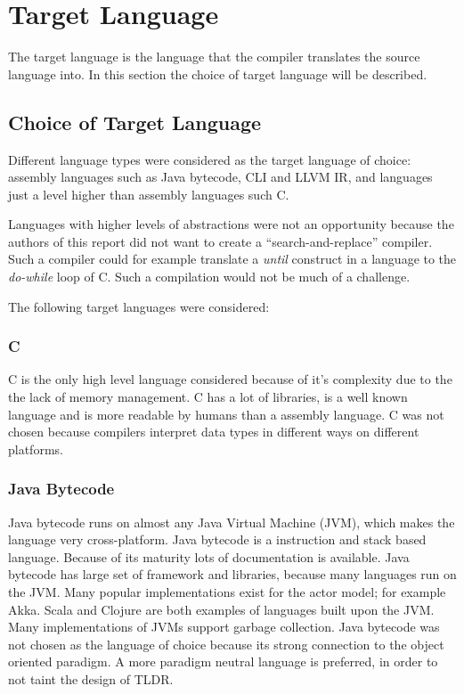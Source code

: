 
\section{Target Language}
\label{sec:targetLanguage}

The target language is the language that the compiler translates the source language into. In this section the choice of target language will be described.

\subsection{Choice of Target Language}

Different language types were considered as the target language of choice: assembly languages such as Java bytecode, CLI and LLVM IR, and languages just a level higher than assembly languages such C.

Languages with higher levels of abstractions were not an opportunity because the authors of this report did not want to create a \enquote{search-and-replace} compiler. Such a compiler could for example translate a \emph{until} construct in a language to the \emph{do-while} loop of C. Such a compilation would not be much of a challenge. 

The following target languages were considered:

\subsubsection{C}
C is the only high level language considered because of it's complexity due to the the lack of memory management. C has a lot of libraries, is a well known language and is more readable by humans than a assembly language. C was not chosen because compilers interpret data types in different ways on different platforms. 

\subsubsection{Java Bytecode}
Java bytecode runs on almost any Java Virtual Machine (JVM), which makes the language very cross-platform. Java bytecode is a instruction and stack based language. Because of its maturity lots of documentation is available. Java bytecode has large set of framework and libraries, because many languages run on the JVM. Many popular implementations exist for the actor model; for example Akka. Scala and Clojure are both examples of languages built upon the JVM. Many implementations of JVMs support garbage collection. Java bytecode was not chosen as the language of choice because its strong connection to the object oriented paradigm. A more paradigm neutral language is preferred, in order to not taint the design of TLDR.

